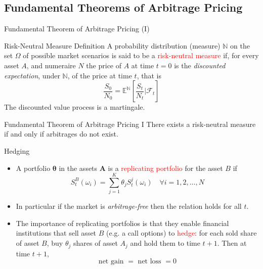\documentclass{beamer}
\begin{document}
\subsection{Fundamental Theorems of Arbitrage Pricing}
\begin{frame}{Fundamental Theorem of Arbitrage Pricing (I)}
	\begin{block}{Risk-Neutral Measure Definition}
		A probability distribution (measure) $\mathbb{N}$ on the set $\Omega$ of possible market scenarios is said to be a \textcolor{red}{risk-neutral measure} if, for every asset $A$, and numeraire $N$ the price of $A$ at time $t=0$ is the \emph{discounted expectation}, under $\mathbb{N}$, of the price at time $t$, that is
		\begin{equation}
			\frac{S_0}{N_0} = \mathbb{E}^{\mathbb{N}}\left[\frac{S_t}{N_t}| \mathcal{F}_t\right]
			\label{eq:risk_neutral_pricing}
		\end{equation}
		The discounted value process is a martingale.
	\end{block}
	\begin{block}{Fundamental Theorem of Arbitrage Pricing I}
		There exists a risk-neutral measure if and only if arbitrages do not exist.
	\end{block}
\end{frame}

\begin{frame}{Hedging}
	\begin{itemize}
		\item A portfolio $\mathbf{\theta}$ in the assets $\mathbf{A}$ is a \textcolor{red}{replicating portfolio} for the asset $B$ if
		\begin{equation}
			S_t^{B}(\omega_i) = \sum_{j=1}^K \theta_j S_t^j(\omega_i)\quad\forall i=1,2,\ldots,N
		\end{equation}
		\item In particular if the market is \emph{arbitrage-free} then the relation holds for all $t$.
		\item The importance of replicating portfolios is that they enable financial institutions that sell
		asset $B$ (e.g. a call options) to \textcolor{red}{hedge}: for each sold share of asset $B$, buy $\theta_j$ shares
		of asset $A_j$ and hold them to time $t + 1$. Then at time $t + 1$, 
		\begin{equation*}
			\text{net gain }= \text{ net loss } = 0
		\end{equation*}
	\end{itemize}
\end{frame}
\end{document}
